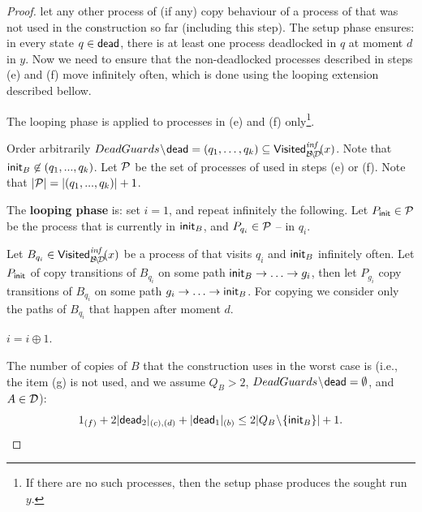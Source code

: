 \begin{proof}
\-[g.] let any other process of \cutoffsys (if any) 
       copy behaviour of a process of \largesys 
       that was not used in the construction so far (including this step).
\il
{}
The setup phase ensures: 
in every state $q \in {\sf dead}$,
there is at least one process deadlocked in $q$ at moment $d$ in $y$. 
Now we need to ensure that the non-deadlocked processes described 
in steps (e) and (f) move infinitely often,
which is done using the looping extension described bellow.

The looping phase is applied to processes in (e) and (f) only\footnote%
{%
  If there are no such processes, then the setup phase produces the sought run $y$.
}.

Order arbitrarily 
$DeadGuards \!\setminus\! {\sf dead} = (q_1,\ldots,q_k) \subseteq \mathsf{Visited}^{\textit{inf}}_{\mathcal{B}\!\setminus\!\mathcal{D}}\!(x)$.
Note that ${\sf init}_B \not\in (q_1,...,q_k)$.
Let $\mathcal{P}$ be the set of processes of \cutoffsys used in steps (e) or (f).
Note that $|\mathcal{P}| = |(q_1,...,q_k)| + 1$.

The \textbf{looping phase} is:
set $i=1$, and repeat infinitely the following.
\li
  \- Let $P_{\sf init} \in \mathcal{P}$ be the process that is currently in ${\sf init}_B$, 
     and $P_{q_i} \in \mathcal{P}$ -- in $q_i$.
     
  \- Let $B_{q_i} \in \mathsf{Visited}^{\textit{inf}}_{\mathcal{B}\!\setminus\!\mathcal{D}}\!(x)$ be a process of \largesys 
     that visits $q_i$ and ${\sf init}_B$ infinitely often.
     Let $P_{\sf init}$ of \cutoffsys copy transitions of $B_{q_i}$
     on some path ${\sf init}_B \to \ldots \to g_i$,
     then let $P_{g_i}$ copy transitions of $B_{q_i}$ on some path 
     $g_i \to \ldots \to {\sf init}_B$. 
     For copying we consider only the paths of $B_{q_i}$ that happen after moment $d$.

  \- $i=i \oplus 1$.
\il

The number of copies of $B$ that the construction uses in the worst case is 
(i.e., the item (g) is not used, and we assume $Q_B>2$, $DeadGuards \!\setminus\! {\sf dead} = \emptyset$, and $A \in \mathcal{D}$):
$$
1_{(f)} + 2|{\sf dead}_2|_{(c),(d)} + |{\sf dead}_1|_{(b)} 
 \leq 
2|Q_B \!\setminus\! \{{\sf init}_B\}| + 1.
$$


\end{proof}
